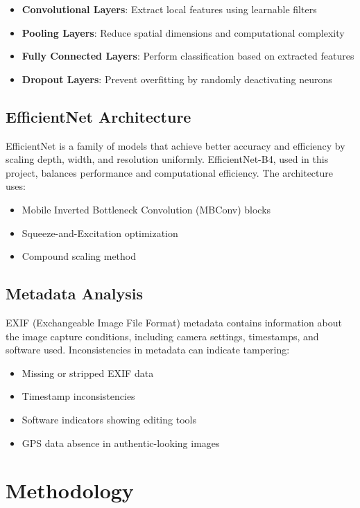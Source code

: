 \documentclass[12pt,a4paper]{article}
\begin{document}
\begin{itemize}
    \item \textbf{Convolutional Layers}: Extract local features using learnable filters
    \item \textbf{Pooling Layers}: Reduce spatial dimensions and computational complexity
    \item \textbf{Fully Connected Layers}: Perform classification based on extracted features
    \item \textbf{Dropout Layers}: Prevent overfitting by randomly deactivating neurons
\end{itemize}

\subsection{EfficientNet Architecture}
EfficientNet is a family of models that achieve better accuracy and efficiency by scaling depth, width, and resolution uniformly. EfficientNet-B4, used in this project, balances performance and computational efficiency. The architecture uses:

\begin{itemize}
    \item Mobile Inverted Bottleneck Convolution (MBConv) blocks
    \item Squeeze-and-Excitation optimization
    \item Compound scaling method
\end{itemize}

\subsection{Metadata Analysis}
EXIF (Exchangeable Image File Format) metadata contains information about the image capture conditions, including camera settings, timestamps, and software used. Inconsistencies in metadata can indicate tampering:

\begin{itemize}
    \item Missing or stripped EXIF data
    \item Timestamp inconsistencies
    \item Software indicators showing editing tools
    \item GPS data absence in authentic-looking images
\end{itemize}

\section{Methodology}
\end{document}
